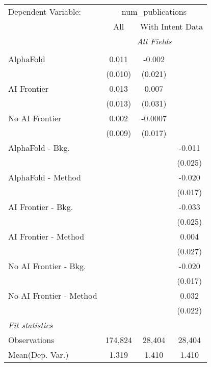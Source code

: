 \begingroup
\centering
\begin{tabular}{lccc}
   \tabularnewline \midrule \midrule
   Dependent Variable: & \multicolumn{3}{c}{num\_publications}\\
 & \multicolumn{1}{c}{All} & \multicolumn{2}{c}{With Intent Data} \\
\cmidrule(lr){2-2} \cmidrule(lr){3-4}
 & \multicolumn{3}{c}{\textit{All Fields}} \\ \\
   AlphaFold               & 0.011   & -0.002  &   \\   
                           & (0.010) & (0.021) &   \\   
   AI Frontier             & 0.013   & 0.007   &   \\   
                           & (0.013) & (0.031) &   \\   
   No AI Frontier          & 0.002   & -0.0007 &   \\   
                           & (0.009) & (0.017) &   \\   
   AlphaFold - Bkg.        &         &         & -0.011\\   
                           &         &         & (0.025)\\   
   AlphaFold - Method      &         &         & -0.020\\   
                           &         &         & (0.017)\\   
   AI Frontier - Bkg.      &         &         & -0.033\\   
                           &         &         & (0.025)\\   
   AI Frontier - Method    &         &         & 0.004\\   
                           &         &         & (0.027)\\   
   No AI Frontier - Bkg.   &         &         & -0.020\\   
                           &         &         & (0.017)\\   
   No AI Frontier - Method &         &         & 0.032\\   
                           &         &         & (0.022)\\   
   \midrule
   \emph{Fit statistics}\\
   Observations            & 174,824 & 28,404  & 28,404\\  
Mean(Dep. Var.) & 1.319 & 1.410 & 1.410 \\
   

\end{tabular}
